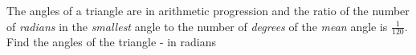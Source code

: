 
%
%
%
%
% 
% 

\question[3] The angles of a triangle are in arithmetic progression and the ratio of 
the number of \textit{radians} in the \textit{smallest} angle to the number of 
\textit{degrees} of the \textit{mean} angle is $\frac{1}{120}$. Find the angles 
of the triangle - in radians 


\ifprintanswers
\fi 

